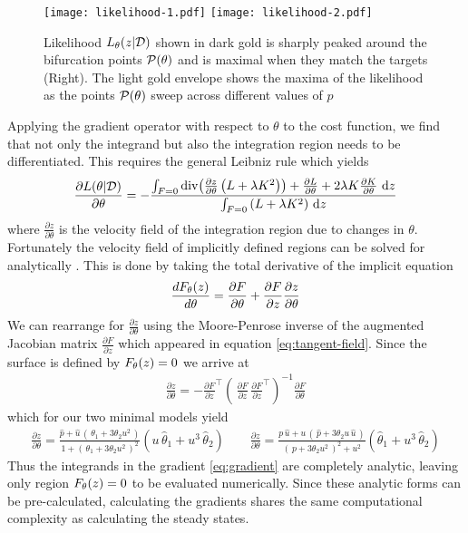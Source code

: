 \begin{figure}[H]
\centering{}
\captionsetup{justification=centering}
\texttt{[image: likelihood-1.pdf]}
\texttt{[image: likelihood-2.pdf]}
\caption{Likelihood $L_{\theta}(z|\mathcal{D})$ shown in dark gold is sharply peaked around the bifurcation points $\mathcal{P}(\theta)$ and is maximal when they match the targets (Right). The light gold envelope shows the maxima of the likelihood as the points $\mathcal{P}(\theta)$ sweep across different values of $p$}
\label{fig:likelihood}
\end{figure}
Applying the gradient operator with respect to $\theta$ to the cost function, we find that not only the integrand but also the integration region needs to be differentiated. This requires the general Leibniz rule \cite{Flanders1973DifferentiationSign} which yields
\begin{align}
\frac{\partial L(\theta|\mathcal{D})}{\partial\theta}=
-\frac{
\int_{F=0}
  \mathrm{div}\!
\left(\frac{\partial z}{\partial\theta}
  \left(L+\lambda K^2\right)
\right)
+\frac{\partial L}{\partial\theta}+
2\lambda K\frac{\partial K}{\partial\theta}
\,\,\mathrm{d}z
}{
\int_{F=0}
\left(
  L+\lambda K^2
\right)\,\mathrm{d}z
}\label{eq:gradient}
\end{align}
where $\frac{\partial z}{\partial\theta}$ is the velocity field of the integration region due to changes in $\theta$. Fortunately the velocity field of implicitly defined regions can be solved for analytically \cite{Jos2011OnSurface}. This is done by taking the total derivative of the implicit equation
\begin{align}
    \frac{dF_{\theta}(z)}{d\theta}=\frac{\partial F}{\partial\theta}+
    \frac{\partial F}{\partial z}\frac{\partial z}{\partial\theta}
\end{align}
We can rearrange for $\frac{\partial z}{\partial\theta}$ using the Moore-Penrose inverse of the augmented Jacobian matrix $\frac{\partial F}{\partial z}$ which appeared in equation \eqref{eq:tangent-field}. Since the surface is defined by $F_{\theta}(z)=0$ we arrive at
\begin{align}
    \frac{\partial z}{\partial\theta} = - \frac{\partial F}{\partial z}^\top
    \left(\,
        \frac{\partial F}{\partial z}\,\frac{\partial F}{\partial z}^\top
    \right)^{-1}
    \frac{\partial F}{\partial\theta}
\end{align}
which for our two minimal models yield
\begin{align}
    \frac{\partial z}{\partial\theta} =
        \frac{ \hat{p}+\hat{u}\,(\,\theta_1+3\theta_2 u^2\,) }{1+(\,\theta_1+3\theta_2 u^2\,)^2}
        \left( u\,\hat{\theta}_1 + u^3\,\hat{\theta}_2 \right)
    \qquad
    \frac{\partial z}{\partial\theta} =
        \frac{ p\,\hat{u} + u\,(\,\hat{p}+3\theta_2u\,\hat{u}\,) }{(\,p+3\theta_2 u^2\,)^2 + u^2 }
        \left( \hat{\theta}_1 + u^3\,\hat{\theta}_2 \right)
    \label{eq:velocity-field-examples}
\end{align}
Thus the integrands in the gradient \eqref{eq:gradient} are completely analytic, leaving only region $F_{\theta}(z)=0$ to be evaluated numerically. Since these analytic forms can be pre-calculated, calculating the gradients shares the same computational complexity as calculating the steady states. 
